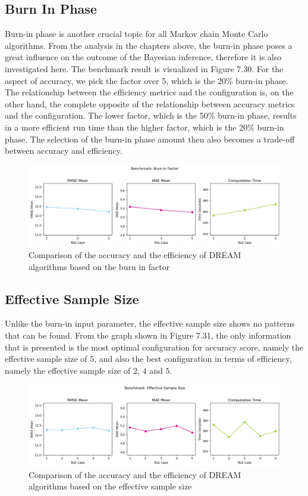 \subsection{Burn In Phase}
Burn-in phase is another crucial topic for all Markov chain Monte Carlo algorithms. From the analysis in the chapters above, the burn-in phase poses a great influence on the outcome of the Bayesian inference, therefore it is also investigated here. The benchmark result is visualized in Figure 7.30. For the aspect of accuracy, we pick the factor over 5, which is the 20\% burn-in phase. The relationship between the efficiency metrics and the configuration is, on the other hand, the complete opposite of the relationship between accuracy metrics and the configuration. The lower factor, which is the 50\% burn-in phase, results in a more efficient run time than the higher factor, which is the 20\% burn-in phase. The selection of the burn-in phase amount then also becomes a trade-off between accuracy and efficiency.
\begin{figure}[H]
    \centering
    \includegraphics[width=1\textwidth]{figures/dream/burn_in.png}
    \captionsetup{width=.8\textwidth}
    \caption{Comparison of the accuracy and the efficiency of DREAM algorithms based on the burn in factor}
    \label{fig:enter-label}
\end{figure}

\subsection{Effective Sample Size}
Unlike the burn-in input parameter, the effective sample size shows no patterns that can be found. From the graph shown in Figure 7.31, the only information that is presented is the most optimal configuration for accuracy score, namely the effective sample size of $5$, and also the best configuration in terms of efficiency, namely the effective sample size of $2$, $4$ and $5$.
\begin{figure}[H]
    \centering
    \includegraphics[width=1\textwidth]{figures/dream/ess.png}
    \captionsetup{width=.8\textwidth}
    \caption{Comparison of the accuracy and the efficiency of DREAM algorithms based on the effective sample size}
    \label{fig:enter-label}
\end{figure}
